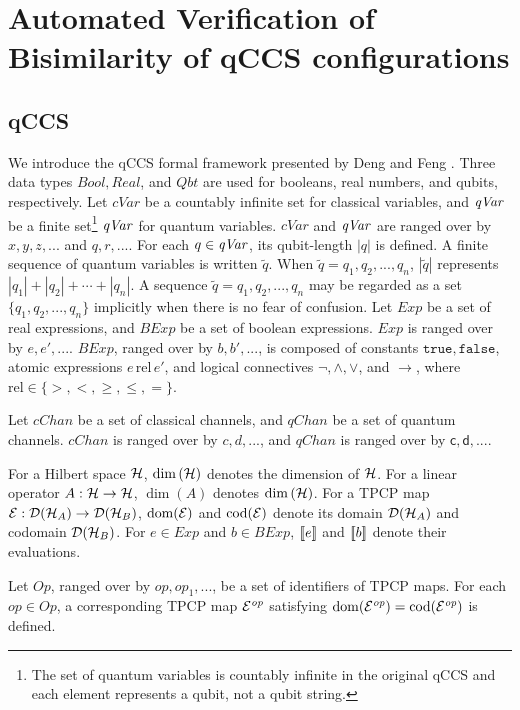\chapter{Automated Verification of Bisimilarity of qCCS configurations}
\label{symqccs}
\section{qCCS}
We introduce the qCCS formal framework presented by Deng and Feng
\cite{DengFeng2012}.
Three data types $\mathit{Bool}, \mathit{Real}$, and $\mathit{Qbt}$ are
used for booleans, real numbers, and qubits, respectively.
Let $\mathit{cVar}$ be a countably infinite set for
classical variables, and $\mathit{qVar}$ be a finite
set\footnote{The set of quantum variables is
countably infinite in the original qCCS and each element
represents a qubit, not a qubit string.} $\mathit{qVar}$
for quantum variables. $\mathit{cVar}$ and $\mathit{qVar}$ are
ranged over by $x, y, z,...$ and $q, r,...$.
For each $q \in \mathit{qVar}$, its qubit-length $|q|$ is defined.
A finite sequence of quantum variables
is written $\tilde q$. When $\tilde q = q_1,q_2,...,q_n$, 
$|\tilde q|$ represents $|q_1| + |q_2| + \cdots + |q_n|$.
A sequence $\tilde q = q_1,q_2,...,q_n$ may be regarded as a set
$\{q_1,q_2,...,q_n\}$ implicitly when there is no fear of confusion.
Let $\mathit{Exp}$ be a set of real expressions,
and $\mathit{BExp}$ be a set of boolean expressions.
$\mathit{Exp}$ is ranged over by $e, e',...$.
$\mathit{BExp}$, ranged over by $b, b',...$, is composed of constants
$\mathtt{true}, \mathtt{false}$, atomic expressions $e\,\mathrm
{rel}\,e'$, and logical connectives $\neg, \wedge, \vee$, and
$\rightarrow$, where $\mathrm{rel} \in \{>, <, \ge, \le, =\}$.

Let $\mathit{cChan}$ be a set of
classical channels, and $\mathit{qChan}$ be
a set of quantum channels.
$\mathit{cChan}$ is ranged over by $c,d,...$, and
$\mathit{qChan}$ is ranged over by $\mathsf{c}, \mathsf{d},...$.

For a Hilbert space $\mathcal{H}$, $\dim{(\mathcal{H})}$ denotes the dimension of $\mathcal{H}$.
For a linear operator $A:\mathcal{H} \rightarrow \mathcal{H}$, $\dim{(A)}$ denotes
$\dim{(\mathcal{H})}$. For a TPCP map $\mathcal{E}:\mathcal{D}(\mathcal{H}_A) \rightarrow \mathcal{D}(\mathcal{H}_B)$,
$\mathrm{dom}(\mathcal{E})$ and $\mathrm{cod}(\mathcal{E})$ denote its domain $\mathcal{D}(\mathcal{H}_A)$ and codomain
$\mathcal{D}(\mathcal{H}_B)$.
For $e \in \mathit{Exp}$ and $b \in \mathit{BExp}$, $[\![e]\!]$ and
$[\![b]\!]$ denote their evaluations.

Let $\mathit{Op}$, ranged
over by $\mathit{op}, \mathit{op}_1,...$, 
be a set of identifiers of TPCP maps.
For each $\mathit{op} \in \mathit{Op}$, 
a corresponding TPCP map $\mathcal{E}^{\mathit{op}}$ satisfying
$\mathrm{dom}(\mathcal{E}^{\mathit{op}}) = \mathrm{cod}(\mathcal{E}^{\mathit{op}})$ is defined.

